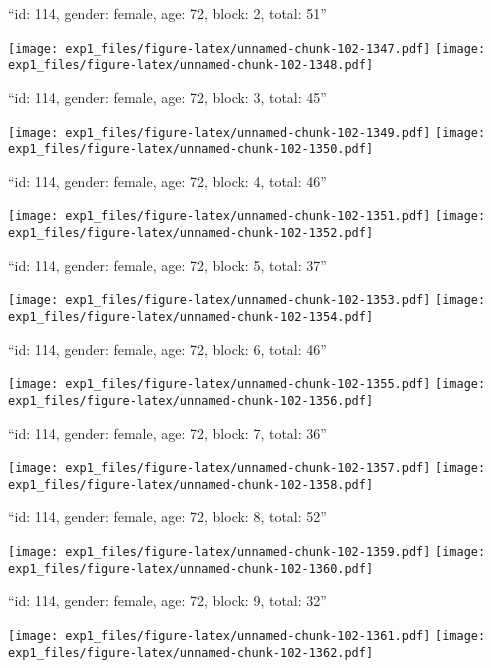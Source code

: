 \documentclass[11pt,,]{article}
\begin{document}
\newpage
[1] 

``id: 114, gender: female, age: 72, block: 2, total: 51''

\texttt{[image: exp1\_files/figure-latex/unnamed-chunk-102-1347.pdf]}
\texttt{[image: exp1\_files/figure-latex/unnamed-chunk-102-1348.pdf]}

\newpage
[1] 

``id: 114, gender: female, age: 72, block: 3, total: 45''

\texttt{[image: exp1\_files/figure-latex/unnamed-chunk-102-1349.pdf]}
\texttt{[image: exp1\_files/figure-latex/unnamed-chunk-102-1350.pdf]}

\newpage
[1] 

``id: 114, gender: female, age: 72, block: 4, total: 46''

\texttt{[image: exp1\_files/figure-latex/unnamed-chunk-102-1351.pdf]}
\texttt{[image: exp1\_files/figure-latex/unnamed-chunk-102-1352.pdf]}

\newpage
[1] 

``id: 114, gender: female, age: 72, block: 5, total: 37''

\texttt{[image: exp1\_files/figure-latex/unnamed-chunk-102-1353.pdf]}
\texttt{[image: exp1\_files/figure-latex/unnamed-chunk-102-1354.pdf]}

\newpage
[1] 

``id: 114, gender: female, age: 72, block: 6, total: 46''

\texttt{[image: exp1\_files/figure-latex/unnamed-chunk-102-1355.pdf]}
\texttt{[image: exp1\_files/figure-latex/unnamed-chunk-102-1356.pdf]}

\newpage
[1] 

``id: 114, gender: female, age: 72, block: 7, total: 36''

\texttt{[image: exp1\_files/figure-latex/unnamed-chunk-102-1357.pdf]}
\texttt{[image: exp1\_files/figure-latex/unnamed-chunk-102-1358.pdf]}

\newpage
[1] 

``id: 114, gender: female, age: 72, block: 8, total: 52''

\texttt{[image: exp1\_files/figure-latex/unnamed-chunk-102-1359.pdf]}
\texttt{[image: exp1\_files/figure-latex/unnamed-chunk-102-1360.pdf]}

\newpage
[1] 

``id: 114, gender: female, age: 72, block: 9, total: 32''

\texttt{[image: exp1\_files/figure-latex/unnamed-chunk-102-1361.pdf]}
\texttt{[image: exp1\_files/figure-latex/unnamed-chunk-102-1362.pdf]}
\end{document}
